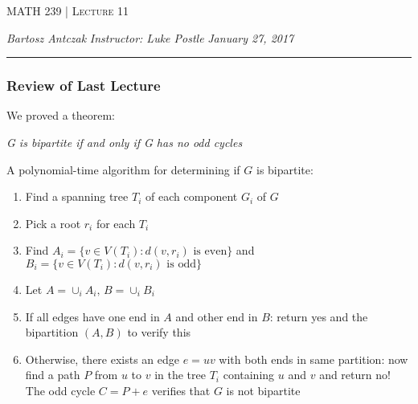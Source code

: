 \documentclass{report}
\newcommand{\lectureNum}{11}
\newcommand{\curDate}{January 27, 2017}
\newcommand{\course}{MATH 239}
\newcommand{\instructor}{Luke Postle}
\begin{document}
\begin{center}
\begin{Large}
\textsc{\course{} | Lecture \lectureNum{}}
\end{Large}
\end{center} 
\noindent \textit{Bartosz Antczak} \hfill
\textit{Instructor: \instructor{}} \hfill
\textit{\curDate{}}
\rule{\textwidth}{0.4pt}

\subsubsection{Review of Last Lecture}
We proved a theorem:
\begin{center}
\textit{G is bipartite if and only if G has no odd cycles}
\end{center}
A polynomial-time algorithm for determining if $G$ is bipartite:
\begin{enumerate}
\item Find a spanning tree $T_i$ of each component $G_i$ of $G$
\item Pick a root $r_i$ for each $T_i$
\item Find $A_i = \{v \in V(T_i) : d(v, r_i) \,\, \mathrm{is \,\,even}\}$ and $B_i = \{v \in V(T_i) : d(v, r_i) \,\, \mathrm{is\,\, odd}\}$
\item Let $A = \cup_i A_i,\, B = \cup_i B_i$
\item If all edges have one end in $A$ and other end in $B$: return yes and the bipartition $(A, B)$ to verify this
\item Otherwise, there exists an edge $e = uv$ with both ends in same partition: now find a path $P$ from $u$ to $v$ in the tree $T_i$ containing $u$ and $v$ and return no! The odd cycle $C = P+e$ verifies that $G$ is not bipartite
\end{enumerate}
\end{document}

